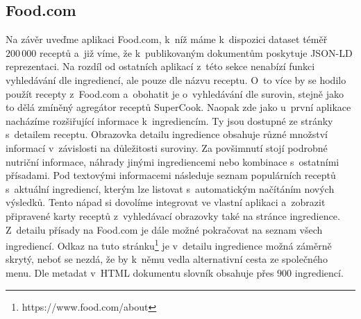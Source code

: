 \subsection{Food.com}

Na závěr uveďme aplikaci Food.com, k~níž máme k~dispozici dataset téměř $200\,000$ receptů a~již víme, že k~publikovaným dokumentům poskytuje JSON-LD reprezentaci. Na rozdíl od ostatních aplikací z~této sekce nenabízí funkci vyhledávání dle ingrediencí, ale pouze dle názvu receptu. O~to více by se hodilo použít recepty z~Food.com a~obohatit je o~vyhledávání dle surovin, stejně jako to dělá zmíněný agregátor receptů SuperCook. Naopak zde jako u~první aplikace nacházíme rozšiřující informace k~ingrediencím. Ty jsou dostupné ze stránky s~detailem receptu. Obrazovka detailu ingredience obsahuje různé množství informací v~závislosti na důležitosti suroviny. Za povšimnutí stojí podrobné nutriční informace, náhrady jinými ingrediencemi nebo kombinace s~ostatními přísadami. Pod textovými informacemi následuje seznam populárních receptů s~aktuální ingrediencí, kterým lze listovat s~automatickým načítáním nových výsledků. Tento nápad si dovolíme integrovat ve vlastní aplikaci a~zobrazit připravené karty receptů z~vyhledávací obrazovky také na stránce ingredience. Z~detailu přísady na Food.com je dále možné pokračovat na seznam všech ingrediencí. Odkaz na tuto stránku\footnote{https://www.food.com/about} je v~detailu ingredience možná záměrně skrytý, neboť se nezdá, že by k~němu vedla alternativní cesta ze společného menu. Dle metadat v~HTML dokumentu slovník obsahuje přes $900$ ingrediencí.
